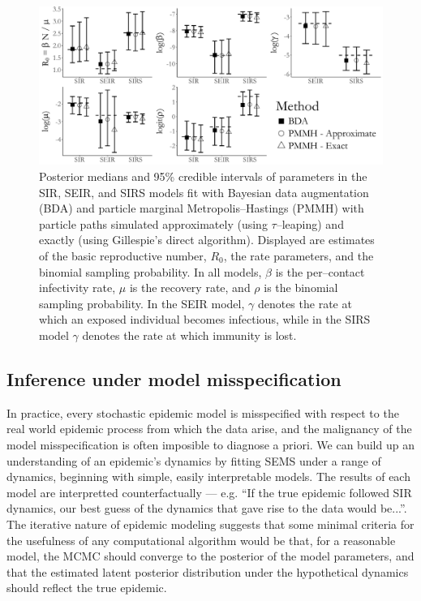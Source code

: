 \begin{figure}[!h]
	\centering
	\includegraphics[width=\linewidth]{figures/sim1_credints.pdf}
	\caption{Posterior medians and 95\% credible intervals of parameters in the SIR, SEIR, and SIRS models fit with Bayesian data augmentation (BDA) and particle marginal Metropolis--Hastings (PMMH) with particle paths simulated approximately (using $ \tau $--leaping) and exactly (using Gillespie's direct algorithm). Displayed are estimates of the basic reproductive number, $ R_0 $, the rate parameters, and the binomial sampling probability. In all models, $ \beta $ is the per--contact infectivity rate, $ \mu $ is the recovery rate, and $ \rho $ is the binomial sampling probability. In the SEIR model, $ \gamma $ denotes the rate at which an exposed individual becomes infectious, while in the SIRS model $ \gamma $ denotes the rate at which immunity is lost.}
	\label{fig:sim1_credint}
\end{figure}

\subsection{Inference under model misspecification}
\label{subsec:bda_misspec_sim}
In practice, every stochastic epidemic model is misspecified with respect to the real world epidemic process from which the data arise, and the malignancy of the model misspecification is often imposible to diagnose a priori. We can build up an understanding of an epidemic's dynamics by fitting SEMS under a range of dynamics, beginning with simple, easily interpretable models. The results of each model are interpretted counterfactually --- e.g. ``If the true epidemic followed SIR dynamics, our best guess of the dynamics that gave rise to the data would be...''. The iterative nature of epidemic modeling suggests that some minimal criteria for the usefulness of any computational algorithm would be that, for a reasonable model, the MCMC should converge to the posterior of the model parameters, and that the estimated latent posterior distribution under the hypothetical dynamics should reflect the true epidemic.

